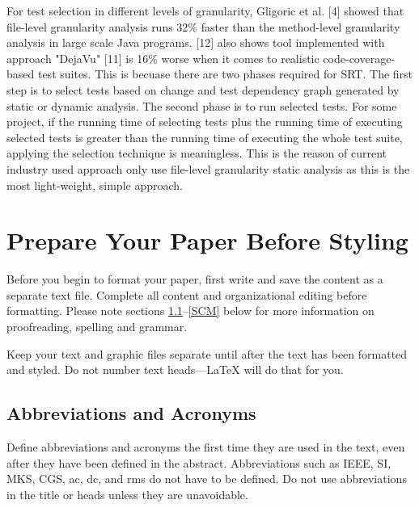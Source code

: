 \documentclass[10pt, conference]{IEEEtran}
\begin{document}
For test selection in different levels of granularity, Gligoric et al. [4] showed that file-level granularity 
analysis runs 32\% faster than the method-level granularity analysis in large scale Java programs.  [12] also shows 
tool implemented with approach "DejaVu" [11] is 16\% worse when it comes to realistic code-coverage-based test suites.
This is becuase there are two phases required for SRT. The first step is to select tests based on change and 
test dependency graph generated by static or dynamic analysis. The second phase is to run selected tests. For 
some project, if the running time of selecting tests plus the running time of executing selected tests is 
greater than the running time of executing the whole test suite, applying the selection technique is 
meaningless. This is the reason of current industry used approach only use file-level granularity static analysis as this is the 
most light-weight, simple approach. 

\section{Prepare Your Paper Before Styling}
Before you begin to format your paper, first write and save the content as a 
separate text file. Complete all content and organizational editing before 
formatting. Please note sections \ref{AA}--\ref{SCM} below for more information on 
proofreading, spelling and grammar.

Keep your text and graphic files separate until after the text has been 
formatted and styled. Do not number text heads---{\LaTeX} will do that 
for you.

\subsection{Abbreviations and Acronyms}\label{AA}
Define abbreviations and acronyms the first time they are used in the text, 
even after they have been defined in the abstract. Abbreviations such as 
IEEE, SI, MKS, CGS, ac, dc, and rms do not have to be defined. Do not use 
abbreviations in the title or heads unless they are unavoidable.
\end{document}
